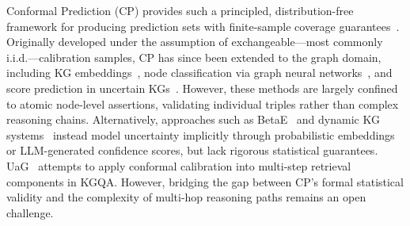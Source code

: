 \documentclass{article}
\newcommand{\jy}[1]{\textcolor{red}{[JY: #1]}}
\theoremstyle{plain}
\theoremstyle{definition}
\theoremstyle{remark}
\begin{document}
Conformal Prediction (CP) provides such a principled, distribution-free framework for producing prediction sets with finite-sample coverage guarantees~\cite{vovk2005algorithmic, first_cp}. 
Originally developed under the assumption of exchangeable---most commonly i.i.d.---calibration samples, 
CP has since been extended to the graph domain, including KG embeddings~\cite{zhu_cp_answerSet}, node classification via graph neural networks~\cite{cp_gnn}, and score prediction in uncertain KGs~\cite{UnKGE}. 
However, these methods are largely confined to atomic node-level assertions, validating individual triples rather than complex reasoning chains. Alternatively, approaches such as BetaE~\cite{Ren2020BetaEFA} and dynamic KG systems~\cite{Takeuchi2025UncertaintyAwareDKA} instead model uncertainty implicitly through probabilistic embeddings or LLM-generated confidence scores, but lack rigorous statistical guarantees. UaG~\cite{Ni_Wang_Cheng_Blasch_Derr_2025} attempts to apply conformal calibration into multi-step retrieval components in KGQA. However, bridging the gap between CP's formal statistical validity and the complexity of multi-hop reasoning paths remains an open challenge. 



\end{document}
